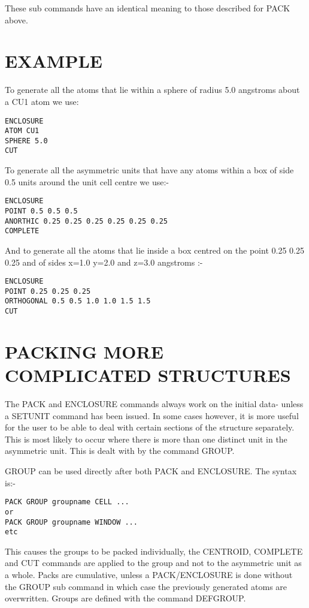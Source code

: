 \documentclass[10pt,a4paper]{report}
\begin{document}
\bigskip{}
These sub commands have an identical meaning to those described
for PACK
above.
\section{EXAMPLE}


To generate all the atoms that lie within a sphere of radius
5.0
angstroms about a CU1 atom we use:
\small\begin{verbatim}
ENCLOSURE
ATOM CU1
SPHERE 5.0
CUT
\end{verbatim}\normalsize




To generate all the asymmetric units that have any atoms within
a box
of side 0.5 units around the unit cell centre we use:-
\small\begin{verbatim}
ENCLOSURE
POINT 0.5 0.5 0.5
ANORTHIC 0.25 0.25 0.25 0.25 0.25 0.25
COMPLETE
\end{verbatim}\normalsize




And to generate all the atoms that lie inside a box centred on
the
point 0.25 0.25 0.25 and of sides x=1.0 y=2.0 and z=3.0 angstroms
:-
\small\begin{verbatim}
ENCLOSURE
POINT 0.25 0.25 0.25
ORTHOGONAL 0.5 0.5 1.0 1.0 1.5 1.5
CUT
\end{verbatim}\normalsize


\section{PACKING MORE COMPLICATED STRUCTURES}


The PACK and ENCLOSURE commands always work on the initial data-
unless a SETUNIT command has been issued. In some cases however, it is
more useful for the user to be able to deal with certain sections of the
structure separately. This is most likely to occur where there is more
than one distinct unit in the asymmetric unit. This is dealt with by the
command GROUP.


\bigskip{}




GROUP can be used directly after both PACK and ENCLOSURE. The syntax
is:-

\small\begin{verbatim}
PACK GROUP groupname CELL ...
or
PACK GROUP groupname WINDOW ...
etc
\end{verbatim}\normalsize


This causes the groups to be packed individually, the CENTROID,
COMPLETE and CUT commands are applied to the group and not to the
asymmetric unit as a whole. Packs are cumulative, unless a
PACK/ENCLOSURE is done without the GROUP sub command in which case the
previously generated atoms are overwritten. Groups are defined with the
command DEFGROUP.
\end{document}
